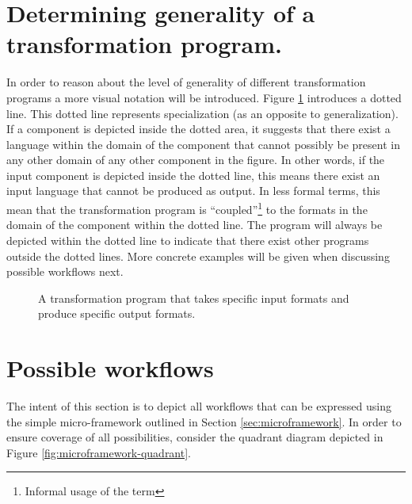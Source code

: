 \documentclass{scrreprt}
\begin{document}
\section{Determining generality of a transformation program.}
In order to reason about the level of generality of different transformation programs a more visual notation will be introduced. Figure \ref{fig:workflows-framework-spec-in-spec-out} introduces  a dotted line. This dotted line represents specialization (as an opposite to generalization). If a component is depicted inside the dotted area, it suggests that there exist a language within the domain of the component that cannot possibly be present in any other domain of any other component in the figure. In other words, if the input component is depicted inside the dotted line, this means there exist an input language that cannot be produced as output. In less formal terms, this mean that the transformation program is ``coupled''\footnote{Informal usage of the term} to the formats in the domain of the component within the dotted line. The program will always be depicted within the dotted line to indicate that there exist other programs outside the dotted lines. More concrete examples will be given when discussing possible workflows next.



\begin{figure}[h]
  \centering


  \caption{A transformation program that takes specific input formats and produce specific output formats.}
  \label{fig:workflows-framework-spec-in-spec-out}
\end{figure}




\section{Possible workflows}
The intent of this section is to depict all workflows that can be expressed using the simple micro-framework outlined in Section \ref{sec:microframework}. In order to ensure coverage of all possibilities, consider the quadrant diagram depicted in Figure \ref{fig:microframework-quadrant}.
\end{document}
